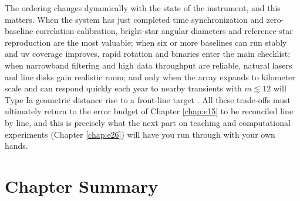 The ordering changes dynamically with the state of the instrument, and this matters. When the system has just completed time synchronization and zero-baseline correlation calibration, bright-star angular diameters and reference-star reproduction are the most valuable; when six or more baselines can run stably and uv coverage improves, rapid rotation and binaries enter the main checklist; when narrowband filtering and high data throughput are reliable, natural lasers and line disks gain realistic room; and only when the array expands to kilometer scale and can respond quickly each year to nearby transients with \(m\lesssim12\) will Type Ia geometric distance rise to a front-line target \citep{2017MNRAS.472.4126G,2022MNRAS.512.1722K,2024MNRAS.529.4387A,2024ApJ...966...28A,2025ApJ...995..191A,2025PhRvD.111h3047K}. All these trade-offs must ultimately return to the error budget of Chapter \ref{chap:e15} to be reconciled line by line, and this is precisely what the next part on teaching and computational experiments (Chapter \ref{chap:e26}) will have you run through with your own hands.

\section*{Chapter Summary}

